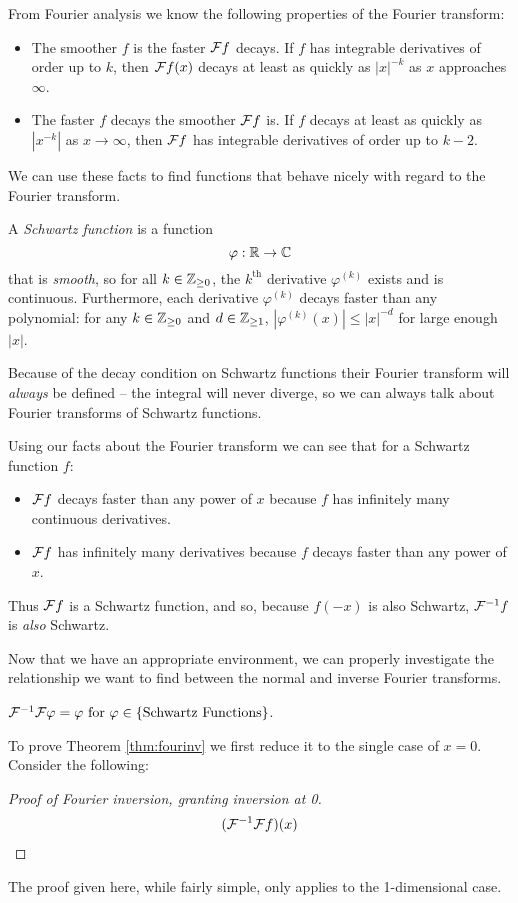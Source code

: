   From Fourier analysis we know the following properties of the Fourier transform: 
  \begin{itemize}
    \item The smoother $f$ is the faster $\mathcal{F} f$ decays.
      If $f$ has integrable derivatives of order up to $k$, then $\mathcal{F} f(x)$ decays at least as quickly as $|x|^{-k}$ as $x$ approaches $\infty$.
    \item The faster $f$ decays the smoother $\mathcal{F} f$ is.
      If $f$ decays at least as quickly as $|x^{-k}|$ as $x\rightarrow\infty$, then $\mathcal{F} f$ has integrable derivatives of order up to $k-2$. %
  \end{itemize}
  We can use these facts to find functions that behave nicely with regard to the Fourier transform.
  \begin{defn}
    A \emph{Schwartz function} is a function
    \begin{equation*}
      \varphi:\mathbb{R}\rightarrow\mathbb{C}
    \end{equation*}
    that is \emph{smooth}, so for all $k\in\mathbb{Z}_{\ge0}$, the $k^\text{th}$ derivative $\varphi^{(k)}$ exists and is continuous.
    Furthermore, each derivative $\varphi^{(k)}$ decays faster than any polynomial: for any $k\in\mathbb{Z}_{\ge0}$ and $d\in\mathbb{Z}_{\ge1}$, $|\varphi^{(k)}(x)|\le|x|^{-d}$ for large enough $|x|$.
  \end{defn}
  Because of the decay condition on Schwartz functions their Fourier transform will \emph{always} be defined -- the integral will never diverge, so we can always talk about Fourier transforms of Schwartz functions.

  Using our facts about the Fourier transform we can see that for a Schwartz function $f$:
  \begin{itemize}
    \item $\mathcal{F} f$ decays faster than any power of $x$ because $f$ has infinitely many continuous derivatives.
    \item $\mathcal{F} f$ has infinitely many derivatives because $f$ decays faster than any power of $x$.
  \end{itemize}
  Thus $\mathcal{F} f$ is a Schwartz function, and so, because $f(-x)$ is also Schwartz, $\mathcal{F}^{-1}f$ is \emph{also} Schwartz.

  Now that we have an appropriate environment, we can properly investigate the relationship we want to find between the normal and inverse Fourier transforms.
  \begin{thm}
    \label{thm:fourinv}
    $\mathcal{F}^{-1}\mathcal{F} \varphi = \varphi \text{ for } \varphi\in\{\text{Schwartz Functions}\}$.
  \end{thm}
  To prove Theorem \ref{thm:fourinv} we first reduce it to the single case of $x=0$.
  Consider the following:
  \begin{proof}[Proof of Fourier inversion, granting inversion at 0]
    \begin{align*}
      (\mathcal{F}^{-1}\mathcal{F} f)(x) 
    \end{align*}
  \end{proof}

  \begin{rmk}
    The proof given here, while fairly simple, only applies to the 1-dimensional case. 
  \end{rmk}
